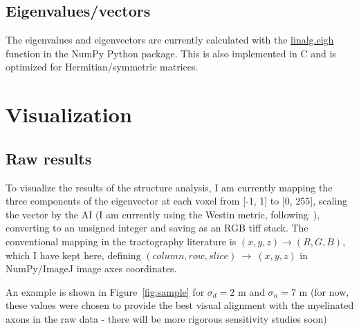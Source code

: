 \documentclass[11pt]{article}
\begin{document}
\subsection{Eigenvalues/vectors}

The eigenvalues and eigenvectors are currently calculated with the
\href{https://docs.scipy.org/doc/numpy/reference/generated/numpy.linalg.eigh.html}{linalg.eigh}
function in the NumPy Python package. This is also implemented in C and is
optimized for Hermitian/symmetric matrices.

\section{Visualization}

\subsection{Raw results}

To visualize the results of the structure analysis, I am currently mapping the
three components of the eigenvector at each voxel from [-1, 1] to [0, 255],
scaling the vector by the AI (I am currently using the Westin metric,
following~\cite{Schilling2018}), converting to an unsigned integer and saving as
an RGB tiff stack. The conventional mapping in the tractography literature is
$(x, y, z)\rightarrow(R, G, B)$, which I have kept here, defining
\newline$(column, row, slice)~\rightarrow~(x,y,z)$ in NumPy/ImageJ image axes
coordinates.

An example is shown in Figure~\ref{fig:sample} for $\sigma_d = 2$ \textmu m and
$\sigma_n = 7$ \textmu m (for now, these values were chosen to provide the best
visual alignment with the myelinated axons in the raw data - there will be more
rigorous sensitivity studies soon)
\end{document}
